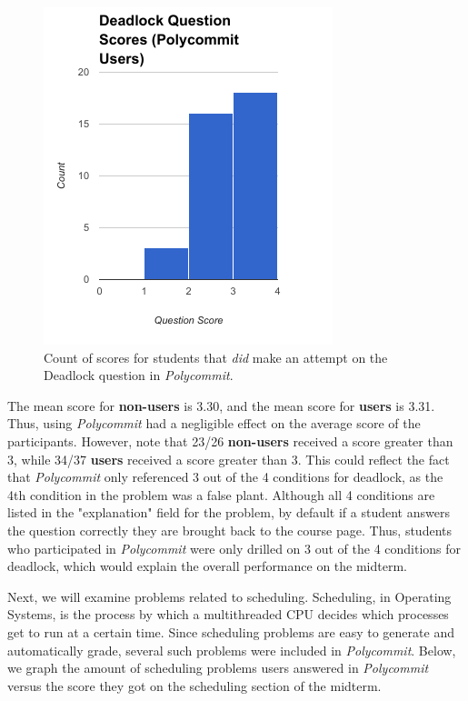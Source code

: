 \begin{figure}[h!b]
	\includegraphics[width=0.5\linewidth]{figures/deadlock-users}
	\caption{Count of scores for students that \textit{did} make an attempt on the Deadlock question in \textit{Polycommit}.}
	\label{fig:deadlock-yes}
\end{figure}

\par The mean score for \textbf{non-users} is 3.30, and the mean score for \textbf{users} is 3.31. Thus, using \textit{Polycommit} had a negligible effect on the average score of the participants. However, note that 23/26 \textbf{non-users} received a score greater than 3, while 34/37 \textbf{users} received a score greater than 3. This could reflect the fact that \textit{Polycommit} only referenced 3 out of the 4 conditions for deadlock, as the 4th condition in the problem was a false plant. Although all 4 conditions are listed in the "explanation" field for the problem, by default if a student answers the question correctly they are brought back to the course page. Thus, students who participated in \textit{Polycommit} were only drilled on 3 out of the 4 conditions for deadlock, which would explain the overall performance on the midterm.

\par Next, we will examine problems related to scheduling. Scheduling, in Operating Systems, is the process by which a multithreaded CPU decides which processes get to run at a certain time. Since scheduling problems are easy to generate and automatically grade, several such problems were included in \textit{Polycommit}. Below, we graph the amount of scheduling problems users answered in \textit{Polycommit} versus the score they got on the scheduling section of the midterm.

